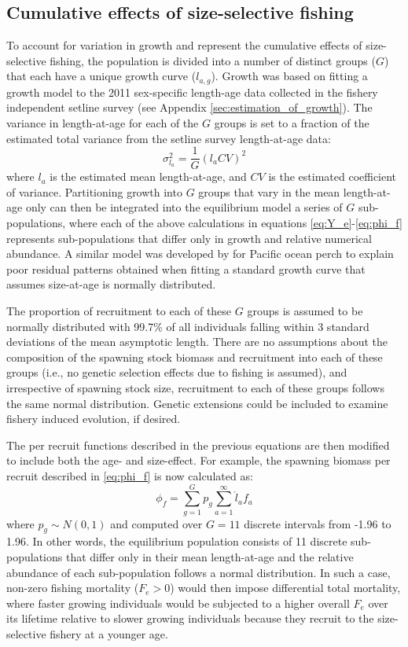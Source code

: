 \subsection*{Cumulative effects of size-selective fishing} %
\label{sub:cumulative_effects_of_size_selective_fishing}
To account for variation in growth and represent the cumulative effects of size-selective fishing, the population is divided into a number of distinct groups ($G$) that each have a unique growth curve ($l_{a,g}$).  Growth was based on fitting a growth model to the 2011 sex-specific length-age data collected in the fishery independent setline survey (see Appendix \ref{sec:estimation_of_growth}). The variance in length-at-age for each of the $G$ groups is set to a fraction of the estimated total variance from  the setline survey length-at-age data:
\[
 \sigma_{l_a}^2 = \frac{1}{G} (l_a CV)^2
\]
where $l_a$ is the estimated mean length-at-age, and $CV$ is the estimated coefficient of variance.  Partitioning growth  into $G$  groups that vary in the mean length-at-age only can then be integrated into the equilibrium model a series of $G$ sub-populations, where each of the above calculations in equations \eqref{eq:Y_e}-\eqref{eq:phi_f} represents sub-populations that differ only in growth and relative numerical abundance. A similar model was developed by \cite{mulligan1992length} for Pacific ocean perch to explain poor residual patterns obtained when fitting a standard growth curve that assumes size-at-age is normally distributed.

The proportion of recruitment to each of these $G$ groups is assumed to be normally distributed with 99.7\% of all individuals falling within 3 standard deviations of the mean asymptotic length.  There are no assumptions about the composition of the spawning stock biomass and recruitment into each of these groups (i.e., no genetic selection effects due to fishing is assumed), and irrespective of spawning stock size, recruitment to each of these groups follows the same normal distribution.  Genetic extensions could be included to examine fishery induced evolution, if desired.

The per recruit functions described in the previous equations are then modified to include both the age- and size-effect.  For example, the spawning biomass per recruit described in \eqref{eq:phi_f} is now calculated as:
\begin{equation}
	\phi_{f} =\sum_{g=1}^G p_g \sum_{a=1}^\infty \acute{l}_a f_a\label{eq:phi_fg}
\end{equation}
where $p_g \sim N(0,1)$ and computed over $G=11$ discrete intervals from -1.96 to 1.96.  In other words, the equilibrium population consists of 11 discrete sub-populations that differ only in their mean length-at-age and the relative abundance of each sub-population follows a normal distribution.  In such a case, non-zero fishing mortality  ($F_e>0$) would then impose differential total mortality, where faster growing individuals would be subjected to a higher overall $F_e$ over its lifetime relative to slower growing individuals because they recruit to the size-selective fishery at a younger age.


